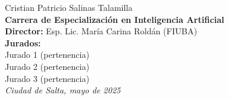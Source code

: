 \begin{titlepage}
\begin{flushright}
        {\fontsize{20pt}{25pt}\selectfont
        Cristian Patricio Salinas Talamilla} \\[1cm]

        {\fontsize{15pt}{20pt}\selectfont
        \textbf{Carrera de Especialización en Inteligencia Artificial}
        } \\[2cm]

        {\fontsize{11pt}{15pt}\selectfont
        \textbf{Director:} Esp. Lic. María Carina Roldán (FIUBA)} \\[1cm]

        {\fontsize{11pt}{15pt}\selectfont
        \textbf{Jurados:}} \\[0.5cm]
        {\fontsize{11pt}{15pt}\selectfont
        Jurado 1 (pertenencia)} \\ 
        {\fontsize{11pt}{15pt}\selectfont
        Jurado 2 (pertenencia)} \\ 
        {\fontsize{11pt}{15pt}\selectfont
        Jurado 3 (pertenencia)} \\[2cm]

        {\itshape\fontsize{10pt}{12pt}\selectfont
        Ciudad de Salta, mayo de 2025} %
    \end{flushright}
\end{titlepage}
